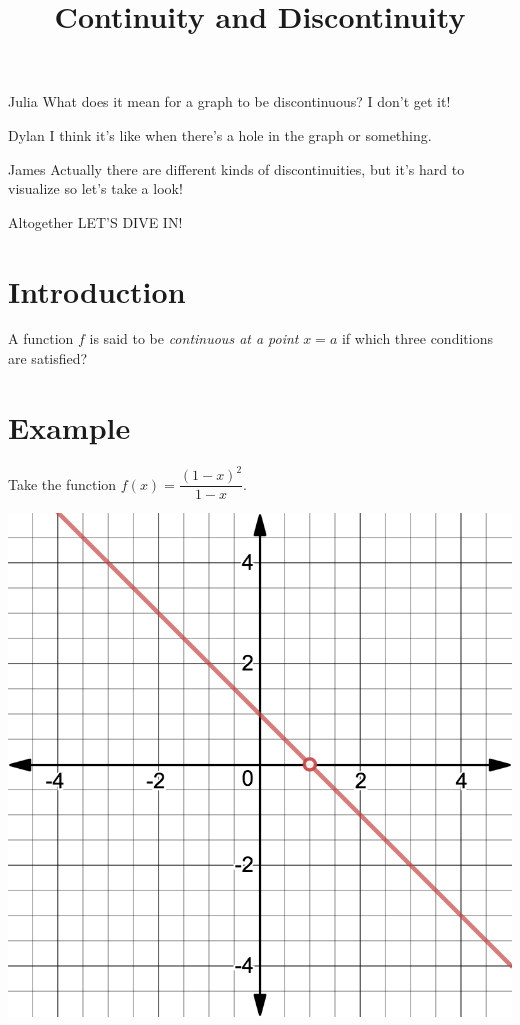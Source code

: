 \documentclass{ximera}
\title{Continuity and Discontinuity}
\begin{document}
\maketitle
\begin{dialogue}
\item[Julia]What does it mean for a graph to be discontinuous? I don't get it!
\item[Dylan] I think it's like when there's a hole in the graph or something.
\item[James] Actually there are different kinds of discontinuities, but it's hard to visualize so let's take a look!
\item[Altogether] LET'S DIVE IN!
\end{dialogue}
\section{Introduction}
\begin{question}
A function $f$ is said to be \textit{continuous at a point} $x = a$ if which three conditions are satisfied?
\begin{selectAll}
\end{selectAll}
\end{question}
\section{Example}
Take the function $f(x) = \dfrac{(1-x)^2}{1-x}$.

\begin{image}
\includegraphics{continuity.png}
\end{image}
\end{document}
